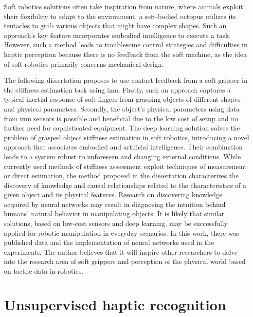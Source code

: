 \documentclass[a4paper, 10pt, twoside]{report}
\begin{document}
Soft robotics solutions often take inspiration from nature, where animals exploit their flexibility to adapt to the environment, \ie a soft-bodied octopus utilizes its tentacles to grab various objects that might have complex shapes. Such an approach's key feature incorporates embodied intelligence to execute a task. However, such a method leads to troublesome control strategies and difficulties in haptic perception because there is no feedback from the soft machine, as the idea of soft robotics primarily concerns mechanical design. 

The following dissertation proposes to use contact feedback from a soft-gripper in the stiffness estimation task using \acrshort{imu}. Firstly, such an approach captures a typical inertial response of soft fingers from grasping objects of different shapes and physical parameters. Secondly, the object's physical parameters using data from \acrshort{imu} sensors is possible and beneficial due to the low cost of setup and no further need for sophisticated equipment. The deep learning solution solves the problem of grasped object stiffness estimation in soft robotics, introducing a novel approach that associates embodied and artificial intelligence. Their combination leads to a system robust to unforeseen and changing external conditions. While currently used methods of stiffness assessment exploit techniques of measurement or direct estimation, the method proposed in the dissertation characterizes the discovery of knowledge and causal relationships related to the characteristics of a given object and its physical features. Research on discovering knowledge acquired by neural networks may result in diagnosing the intuition behind humans' natural behavior in manipulating objects. It is likely that similar solutions, based on low-cost sensors and deep learning, may be successfully applied for robotic manipulation in everyday scenarios. In this work, there was published data and the implementation of neural networks used in the experiments. The author believes that it will inspire other researchers to delve into the research area of soft grippers and perception of the physical world based on tactile data in robotics.

\section{Unsupervised haptic recognition}
\end{document}
